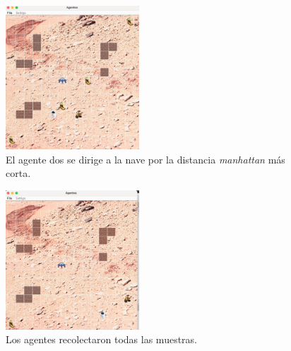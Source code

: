 \begin{multicols}{2}
		\begin{figure}[H]
			\centering
			\includegraphics[width = 5cm]{images/sample.jpg}
			\caption{El agente dos se dirige a la nave por la distancia \textit{manhattan} más corta.}
			\label{figSample}
		\end{figure}
		\begin{figure}[H]
			\centering
			\includegraphics[width = 5cm]{images/end.jpg}
			\caption{Los agentes recolectaron todas las muestras.}
			\label{figEnd}
		\end{figure}
	\end{multicols}